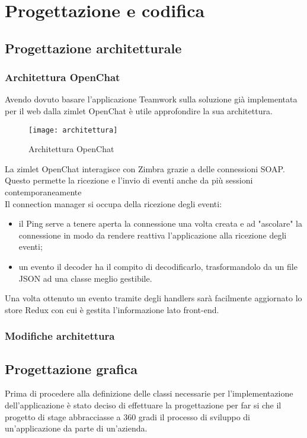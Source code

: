 
\chapter{Progettazione e codifica}\label{chap:design}

\section {Progettazione architetturale}
\subsection{Architettura OpenChat}
Avendo dovuto basare l'applicazione Teamwork sulla soluzione già implementata per il web dalla zimlet OpenChat è utile approfondire la sua architettura.
\begin{figure}[H] 
	\centering
	\texttt{[image: architettura]}
	\caption{Architettura OpenChat}
\end{figure}
La zimlet OpenChat interagisce con Zimbra grazie a delle connessioni SOAP. Questo permette la ricezione e l'invio di eventi anche da più sessioni contemporaneamente \\
Il connection manager si occupa della ricezione degli eventi:
\begin{itemize}
	\item il Ping serve a tenere aperta la connessione una volta creata e ad "ascolare" la connessione in modo da rendere reattiva l'applicazione alla ricezione degli eventi;
	\item {} un evento il decoder ha il compito di decodificarlo, trasformandolo da un file JSON ad una classe meglio gestibile.
\end{itemize}
Una volta ottenuto un evento tramite degli handlers sarà facilmente aggiornato lo store Redux con cui è gestita l'informazione lato front-end.


\subsection{Modifiche architettura}

\section{Progettazione grafica}
Prima di procedere alla definizione delle classi necessarie per l'implementazione 
dell'applicazione è stato deciso di effettuare la progettazione  per far 
si che il progetto di stage abbracciasse a 360 gradi il processo di sviluppo di 
un'applicazione da parte di un'azienda.

